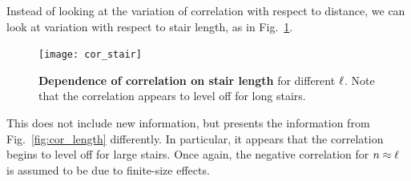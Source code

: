Instead of looking at the variation of correlation with respect to distance, we can look at variation with respect to stair length, as in Fig.~\ref{fig:cor_stair}.
\begin{figure}
	\centering
	\texttt{[image: cor\_stair]}
	\caption{\textbf{Dependence of correlation on stair length} for different $\ell$. Note that the correlation appears to level off for long stairs.}
	\label{fig:cor_stair}
\end{figure}
This does not include new information, but presents the information from Fig.~\ref{fig:cor_length} differently. In particular, it appears that the correlation begins to level off for large stairs. Once again, the negative correlation for $n\approx\ell$ is assumed to be due to finite-size effects.